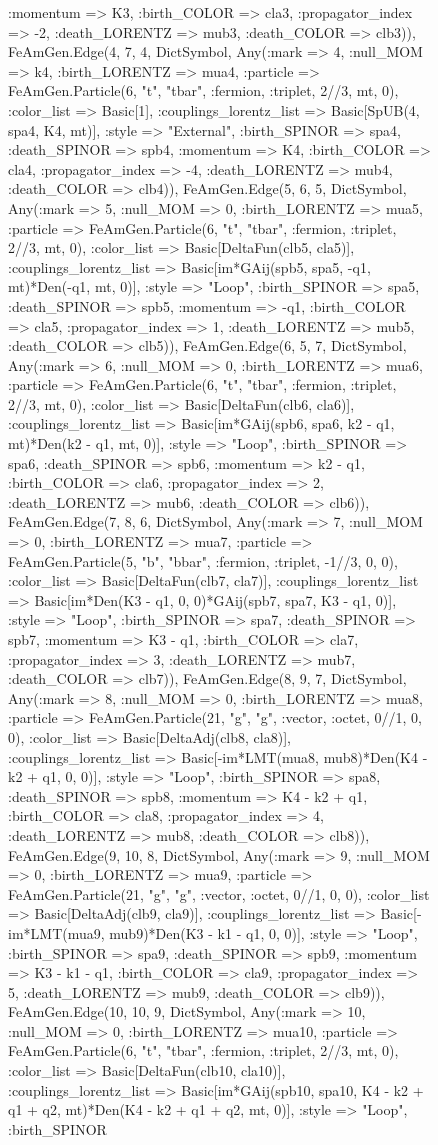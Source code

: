 \documentclass{revtex4}
\begin{document}
\begin{figure}[!htb]
\begin{center}
{:momentum => K3, :birth_COLOR => cla3, :propagator_index => -2, :death_LORENTZ => mub3, :death_COLOR => clb3)), FeAmGen.Edge(4, 7, 4, Dict{Symbol, Any}(:mark => 4, :null_MOM => k4, :birth_LORENTZ => mua4, :particle => FeAmGen.Particle(6, "t", "tbar", :fermion, :triplet, 2//3, mt, 0), :color_list => Basic[1], :couplings_lorentz_list => Basic[SpUB(4, spa4, K4, mt)], :style => "External", :birth_SPINOR => spa4, :death_SPINOR => spb4, :momentum => K4, :birth_COLOR => cla4, :propagator_index => -4, :death_LORENTZ => mub4, :death_COLOR => clb4)), FeAmGen.Edge(5, 6, 5, Dict{Symbol, Any}(:mark => 5, :null_MOM => 0, :birth_LORENTZ => mua5, :particle => FeAmGen.Particle(6, "t", "tbar", :fermion, :triplet, 2//3, mt, 0), :color_list => Basic[DeltaFun(clb5, cla5)], :couplings_lorentz_list => Basic[im*GAij(spb5, spa5, -q1, mt)*Den(-q1, mt, 0)], :style => "Loop", :birth_SPINOR => spa5, :death_SPINOR => spb5, :momentum => -q1, :birth_COLOR => cla5, :propagator_index => 1, :death_LORENTZ => mub5, :death_COLOR => clb5)), FeAmGen.Edge(6, 5, 7, Dict{Symbol, Any}(:mark => 6, :null_MOM => 0, :birth_LORENTZ => mua6, :particle => FeAmGen.Particle(6, "t", "tbar", :fermion, :triplet, 2//3, mt, 0), :color_list => Basic[DeltaFun(clb6, cla6)], :couplings_lorentz_list => Basic[im*GAij(spb6, spa6, k2 - q1, mt)*Den(k2 - q1, mt, 0)], :style => "Loop", :birth_SPINOR => spa6, :death_SPINOR => spb6, :momentum => k2 - q1, :birth_COLOR => cla6, :propagator_index => 2, :death_LORENTZ => mub6, :death_COLOR => clb6)), FeAmGen.Edge(7, 8, 6, Dict{Symbol, Any}(:mark => 7, :null_MOM => 0, :birth_LORENTZ => mua7, :particle => FeAmGen.Particle(5, "b", "bbar", :fermion, :triplet, -1//3, 0, 0), :color_list => Basic[DeltaFun(clb7, cla7)], :couplings_lorentz_list => Basic[im*Den(K3 - q1, 0, 0)*GAij(spb7, spa7, K3 - q1, 0)], :style => "Loop", :birth_SPINOR => spa7, :death_SPINOR => spb7, :momentum => K3 - q1, :birth_COLOR => cla7, :propagator_index => 3, :death_LORENTZ => mub7, :death_COLOR => clb7)), FeAmGen.Edge(8, 9, 7, Dict{Symbol, Any}(:mark => 8, :null_MOM => 0, :birth_LORENTZ => mua8, :particle => FeAmGen.Particle(21, "g", "g", :vector, :octet, 0//1, 0, 0), :color_list => Basic[DeltaAdj(clb8, cla8)], :couplings_lorentz_list => Basic[-im*LMT(mua8, mub8)*Den(K4 - k2 + q1, 0, 0)], :style => "Loop", :birth_SPINOR => spa8, :death_SPINOR => spb8, :momentum => K4 - k2 + q1, :birth_COLOR => cla8, :propagator_index => 4, :death_LORENTZ => mub8, :death_COLOR => clb8)), FeAmGen.Edge(9, 10, 8, Dict{Symbol, Any}(:mark => 9, :null_MOM => 0, :birth_LORENTZ => mua9, :particle => FeAmGen.Particle(21, "g", "g", :vector, :octet, 0//1, 0, 0), :color_list => Basic[DeltaAdj(clb9, cla9)], :couplings_lorentz_list => Basic[-im*LMT(mua9, mub9)*Den(K3 - k1 - q1, 0, 0)], :style => "Loop", :birth_SPINOR => spa9, :death_SPINOR => spb9, :momentum => K3 - k1 - q1, :birth_COLOR => cla9, :propagator_index => 5, :death_LORENTZ => mub9, :death_COLOR => clb9)), FeAmGen.Edge(10, 10, 9, Dict{Symbol, Any}(:mark => 10, :null_MOM => 0, :birth_LORENTZ => mua10, :particle => FeAmGen.Particle(6, "t", "tbar", :fermion, :triplet, 2//3, mt, 0), :color_list => Basic[DeltaFun(clb10, cla10)], :couplings_lorentz_list => Basic[im*GAij(spb10, spa10, K4 - k2 + q1 + q2, mt)*Den(K4 - k2 + q1 + q2, mt, 0)], :style => "Loop", :birth_SPINOR }
\end{center}
\end{figure}
\end{document}
